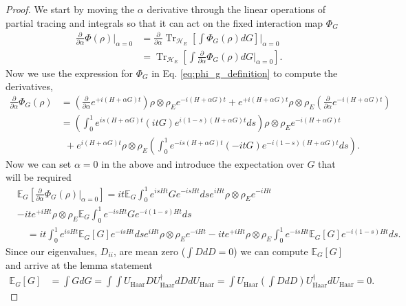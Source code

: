 \documentclass{article}
\newcommand{\haar}{\text{Haar}}
\newcommand{\parens}[1]{\left( #1 \right)}
\newcommand{\brackets}[1]{\left[ #1 \right]}
\DeclareMathOperator{\Tr}{Tr}
\newcommand{\partrace}[2]{\Tr_{#1} \brackets{ #2 }}
\begin{document}
\begin{proof}
    We start by moving the $\alpha$ derivative through the linear operations of partial tracing and integrals so that it can act on the fixed interaction map $\Phi_G$
    \begin{align}
        \frac{\partial}{\partial \alpha} \Phi(\rho) \bigg|_{\alpha = 0} &= \frac{\partial}{\partial \alpha} \partrace{\mathcal{H}_E}{\int \Phi_G(\rho) dG} \bigg|_{\alpha = 0} \\
         &= \partrace{\mathcal{H}_E}{\int \frac{\partial}{\partial \alpha} \Phi_G(\rho) dG \bigg|_{\alpha = 0} } .
    \end{align}
    Now we use the expression for $\Phi_G$ in Eq. \eqref{eq:phi_g_definition} to compute the derivatives,
    \begin{align}
        \frac{\partial}{\partial \alpha} \Phi_G (\rho) &= \parens{\frac{\partial}{\partial \alpha} e^{+ i (H + \alpha G)t}} \rho \otimes \rho_E e^{-i (H + \alpha G) t} + e^{+i (H + \alpha G)t} \rho \otimes \rho_E \parens{\frac{\partial}{\partial \alpha} e^{- i (H + \alpha G)t}} \\
        &= \parens{\int_{0}^{1} e^{i s (H+\alpha G)t} (i t G) e^{i (1-s) (H+\alpha G)t} ds} \rho \otimes \rho_E e^{-i(H+\alpha G)t} \nonumber \\
    &~ ~+ e^{i(H+\alpha G)t} \rho \otimes \rho_E \parens{\int_{0}^1 e^{-i s (H+\alpha G) t} (- i t G) e^{-i (1-s) (H+\alpha G)t} ds}. \label{eq:first_order_alpha_derivative}
    \end{align}
    Now we can set $\alpha = 0$ in the above and introduce the expectation over $G$ that will be required
    \begin{align}
        &\mathbb{E}_G\left[ \frac{\partial}{\partial \alpha} \Phi_G(\rho) \bigg|_{\alpha = 0}\right] = i t \mathbb{E}_G \int_0^1 e^{i s H t} G e^{-i s H t} ds e^{i H t} \rho \otimes \rho_E e^{-i H t} \nonumber\\
&- i t e^{+i H t} \rho \otimes \rho_E \mathbb{E}_G \int_0^1 e^{-is H t} G e^{-i(1-s) Ht} ds \\ 
        &\quad= i t \int_0^1 e^{i s H t} \mathbb{E}_G[G] e^{-i s H t} ds e^{i H t} \rho \otimes \rho_E e^{-i H t} - i t e^{+i H t} \rho \otimes \rho_E \int_0^1 e^{-is H t} \mathbb{E}_G[G] e^{-i(1-s) Ht} ds.
    \end{align}
    Since our eigenvalues, $D_{ii}$, are mean zero ($\int D dD = 0$) we can compute $\mathbb{E}_G [G] $ and arrive at the lemma statement
    \begin{align}
        \mathbb{E}_G [G] &= \int G dG = \int \int U_{\haar} D U_{\haar}^\dagger dD dU_{\haar} = \int U_{\haar} \left( \int D dD \right) U_{\haar}^\dagger dU_{\haar} = 0.
    \end{align}
\end{proof}
\end{document}
